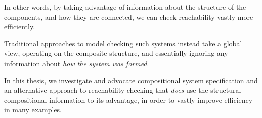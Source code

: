 In other words, by taking advantage of information about the structure of the
components, and how they are connected, we can check reachability vastly more
efficiently.

Traditional approaches to model checking such systems instead take a global
view, operating on the composite structure, and essentially ignoring any
information about \emph{how the system was formed}.

In this thesis, we investigate and advocate compositional system specification
and an alternative approach to reachability checking that \emph{does} use the
structural compositional information to its advantage, in order to vastly
improve efficiency in many examples.
